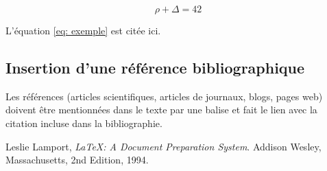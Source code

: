 \documentclass{rapportCS}
\begin{document}
\begin{equation} \label{eq: exemple}
\rho + \Delta = 42
\end{equation}

L'équation \ref{eq: exemple} est citée ici. 

\subsection{Insertion d'une référence bibliographique}
Les références (articles scientifiques, articles de journaux, blogs, pages web) doivent être mentionnées dans le texte par une balise \cite{maref} et fait le lien avec la citation incluse dans la bibliographie.


\begin{thebibliography}{15} %
	  Leslie Lamport,
	  \emph{\LaTeX: A Document Preparation System}.
	  Addison Wesley, Massachusetts,
	  2nd Edition,
	  1994.
\end{thebibliography}
\end{document}
